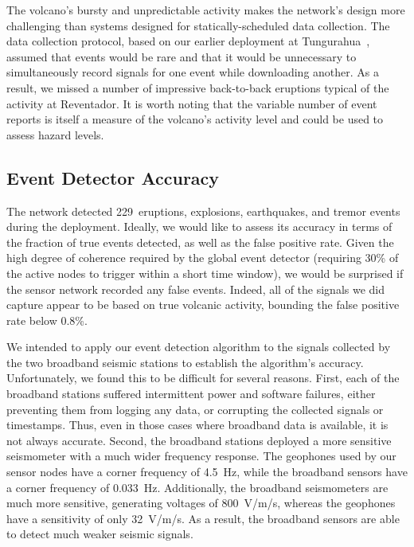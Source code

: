 The volcano's bursty and unpredictable activity makes the network's design
more challenging than systems designed for statically-scheduled data
collection. The data collection protocol, based on our earlier deployment at
Tungurahua~\cite{volcano-ewsn05}, assumed that events would be rare and that
it would be unnecessary to simultaneously record signals for one event while
downloading another. As a result, we missed a number of impressive
back-to-back eruptions typical of the activity at Reventador. It is worth
noting that the variable number of event reports is itself a measure of the
volcano's activity level and could be used to assess hazard levels. 

\subsection{Event Detector Accuracy}
\label{sec-eventdetectaccuracy}

The network detected 229~eruptions, explosions, earthquakes, and tremor
events during the deployment. Ideally, we would like to assess its accuracy
in terms of the fraction of true events detected, as well as the false
positive rate. Given the high degree of coherence required by the global
event detector (requiring 30\% of the active nodes to trigger within a short
time window), we would be surprised if the sensor network recorded any false
events. Indeed, all of the signals we did capture appear to be based on true
volcanic activity, bounding the false positive rate below 0.8\%.

We intended to apply our event detection algorithm to the signals collected
by the two broadband seismic stations to establish the algorithm's accuracy.
Unfortunately, we found this to be difficult for several reasons. First, each
of the broadband stations suffered intermittent power and software failures,
either preventing them from logging any data, or corrupting the collected
signals or timestamps. Thus, even in those cases where broadband data is
available, it is not always accurate. Second, the broadband stations deployed
a more sensitive seismometer with a much wider frequency response. The
geophones used by our sensor nodes have a corner frequency of 4.5~Hz, while
the broadband sensors have a corner frequency of 0.033~Hz. Additionally, the
broadband seismometers are much more sensitive, generating voltages of
800~V/m/s, whereas the geophones have a sensitivity of only 32~V/m/s. As a
result, the broadband sensors are able to detect much weaker seismic signals.

